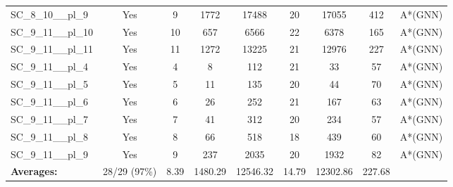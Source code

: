 \documentclass{article}
\begin{document}
\begin{tabular}{lcccccccc}
SC\_8\_10\_\_pl\_9 & Yes & 9 & 1772 & 17488 & 20 & 17055 & 412 & A*(GNN) \\
SC\_9\_11\_\_pl\_10 & Yes & 10 & 657 & 6566 & 22 & 6378 & 165 & A*(GNN) \\
SC\_9\_11\_\_pl\_11 & Yes & 11 & 1272 & 13225 & 21 & 12976 & 227 & A*(GNN) \\
SC\_9\_11\_\_pl\_4 & Yes & 4 & 8 & 112 & 21 & 33 & 57 & A*(GNN) \\
SC\_9\_11\_\_pl\_5 & Yes & 5 & 11 & 135 & 20 & 44 & 70 & A*(GNN) \\
SC\_9\_11\_\_pl\_6 & Yes & 6 & 26 & 252 & 21 & 167 & 63 & A*(GNN) \\
SC\_9\_11\_\_pl\_7 & Yes & 7 & 41 & 312 & 20 & 234 & 57 & A*(GNN) \\
SC\_9\_11\_\_pl\_8 & Yes & 8 & 66 & 518 & 18 & 439 & 60 & A*(GNN) \\
SC\_9\_11\_\_pl\_9 & Yes & 9 & 237 & 2035 & 20 & 1932 & 82 & A*(GNN) \\
\textbf{Averages:} & 28/29 (97\%) & 8.39 & 1480.29 & 12546.32 & 14.79 & 12302.86 & 227.68 & \\
\bottomrule
\end{tabular}
\\[0.7cm]
\end{document}
